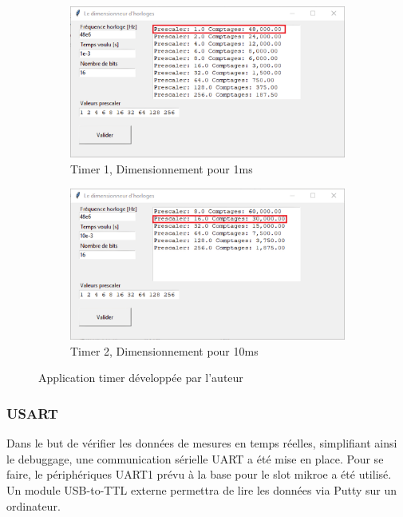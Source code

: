 {	\begin{figure}[h]
		\centering
		\begin{subfigure}[b]{0.45\textwidth}
			\centering
			\includegraphics[width=\textwidth]{Figures/Dev-SOFT/Timer1ms}
			\caption{Timer 1, Dimensionnement pour 1ms}
			\label{fig:timer1ms}
		\end{subfigure}
		\hfill
		\begin{subfigure}[b]{0.45\textwidth}
			\centering
			\includegraphics[width=\textwidth]{Figures/Dev-SOFT/Timer10ms}
			\caption{Timer 2, Dimensionnement pour 10ms}
			\label{fig:timer10ms}
		\end{subfigure}
		\hfill
		\caption{Application timer développée par l'auteur}
		\label{fig:appTimer}
	\end{figure}

	\clearpage

	\subsubsection{USART} \label{ssec:Usart}
	Dans le but  de vérifier les données de mesures en temps réelles, simplifiant ainsi le debuggage, une communication sérielle UART a été mise en place. Pour se faire, le périphériques UART1 prévu à la base pour le slot mikroe a été utilisé. Un module USB-to-TTL externe permettra de lire les données via Putty sur un ordinateur.
	
}
